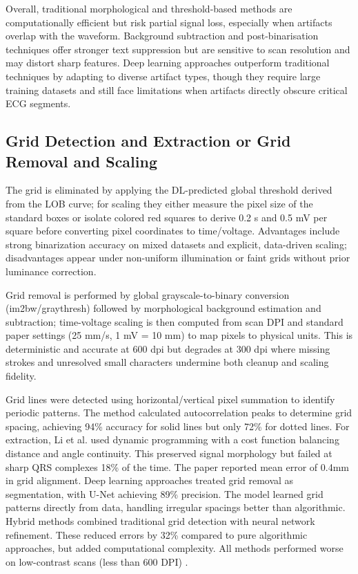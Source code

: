 Overall, traditional morphological and threshold-based methods are computationally efficient but risk partial signal loss, especially when artifacts overlap with the waveform. Background subtraction and post-binarisation techniques offer stronger text suppression but are sensitive to scan resolution and may distort sharp features. Deep learning approaches outperform traditional techniques by adapting to diverse artifact types, though they require large training datasets and still face limitations when artifacts directly obscure critical ECG segments.


\subsection{Grid Detection and Extraction or Grid Removal and Scaling}

The grid is eliminated by applying the DL-predicted global threshold derived from the LOB curve; for scaling they either measure the pixel size of the standard boxes or isolate colored red squares to derive 0.2 s and 0.5 mV per square before converting pixel coordinates to time/voltage. Advantages include strong binarization accuracy on mixed datasets and explicit, data-driven scaling; disadvantages appear under non-uniform illumination or faint grids without prior luminance correction. \cite{Mishra2021}

Grid removal is performed by global grayscale-to-binary conversion (im2bw/graythresh) followed by morphological background estimation and subtraction; time-voltage scaling is then computed from scan DPI and standard paper settings (25 mm/s, 1 mV = 10 mm) to map pixels to physical units. This is deterministic and accurate at 600 dpi but degrades at 300 dpi where missing strokes and unresolved small characters undermine both cleanup and scaling fidelity. \cite{Tun2017AnalysisOC}

Grid lines were detected using horizontal/vertical pixel summation to identify periodic patterns. The method calculated autocorrelation peaks to determine grid spacing, achieving 94\% accuracy for solid lines but only 72\% for dotted lines. For extraction, Li et al. used dynamic programming with a cost function balancing distance and angle continuity. This preserved signal morphology but failed at sharp QRS complexes 18\% of the time. The paper reported mean error of 0.4mm in grid alignment. Deep learning approaches treated grid removal as segmentation, with U-Net achieving 89\% precision. The model learned grid patterns directly from data, handling irregular spacings better than algorithmic.
Hybrid methods combined traditional grid detection with neural network refinement. These reduced errors by 32\% compared to pure algorithmic approaches, but added computational complexity. All methods performed worse on low-contrast scans (less than 600 DPI) \cite{LI2020104077}. %

